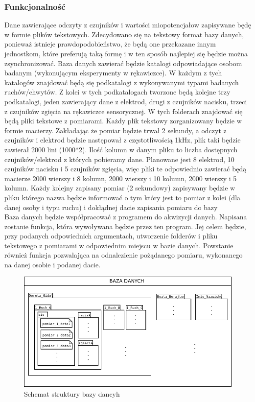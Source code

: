 \documentclass{article}
\begin{document}
\subsubsection{Funkcjonalność}
Dane zawierające odczyty z czujników i wartości miopotencjałow zapisywane będę w formie plików tekstowych. Zdecydowano się na tekstowy format bazy danych, ponieważ istnieje prawdopodobieństwo, że będą one przekazane innym jednostkom, które preferują taką formę i w ten sposób najlepiej się będzie można zsynchronizować. Baza danych zawierać będzie katalogi odpowiadające osobom badanym (wykonującym eksperymenty w rękawiczce). W każdym z tych katalogów znajdować będą się podkatalogi z wykonywanymi typami badanych ruchów/chwytów. Z kolei w tych podkatalogach tworzone będą kolejne trzy podkatalogi, jeden zawierający dane z elektrod, drugi z czujników nacisku, trzeci z czujników zgięcia na rękawiczce sensorycznej. W tych folderach znajdować się będą pliki tekstowe z pomiarami. Każdy plik tekstowy zorganizowany będzie w formie macierzy. Zakładając że pomiar będzie trwał 2 sekundy, a odczyt z czujników i elektrod będzie następował z częstotliwością 1kHz, plik taki będzie zawierał 2000 lini (1000*2). Ilość kolumn w danym pliku to liczba dostępnych czujników/elektrod z których pobieramy dane. Planowane jest 8 elektrod, 10 czujników nacisku i 5 czujników zgięcia, więc pliki te odpowiednio zawierać będą macierze 2000 wierszy i 8 kolumn, 2000 wierszy i 10 kolumn, 2000 wierszy i 5 kolumn. Każdy kolejny zapisany pomiar (2 sekundowy) zapisywany będzie w pliku którego nazwa będzie informować o tym który jest to pomiar z kolei (dla danej osoby i typu ruchu) i dokłądnej dacie zapisania pomiaru do bazy\\
Baza danych będzie współpracować z programem do akwizycji danych. Napisana zostanie funkcja, która wywoływana będzie przez ten program. Jej celem będzie, przy podanych odpowiednich argumentach, utworzenie folderów i pliku tekstowego z pomiarami w odpowiednim miejscu w bazie danych. Powstanie również funkcja pozwalająca na odnalezienie pożądanego pomiaru, wykonanego na danej osobie i podanej dacie.

\begin{figure}[ht!]
\label{fig:baza_danych}
\centering
\includegraphics[width=14cm]{baza_danych.png}
\caption {Schemat struktury bazy dancyh}
\end{figure}
\end{document}
